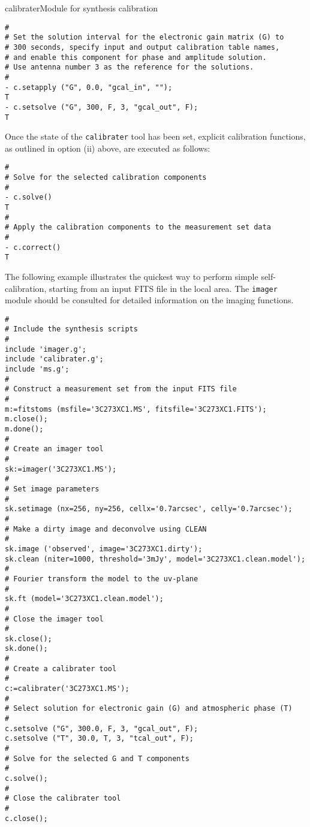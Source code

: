 \begin{ahmodule}{calibrater}{Module for synthesis calibration}
\begin{ahdescription}
\begin{verbatim}
#
# Set the solution interval for the electronic gain matrix (G) to
# 300 seconds, specify input and output calibration table names,
# and enable this component for phase and amplitude solution.
# Use antenna number 3 as the reference for the solutions.
#
- c.setapply ("G", 0.0, "gcal_in", "");
T
- c.setsolve ("G", 300, F, 3, "gcal_out", F);
T
\end{verbatim}

Once the state of the {\tt calibrater} tool has been set, explicit
calibration functions, as outlined in option (ii) above, are executed as
follows:

\begin{verbatim}
#
# Solve for the selected calibration components
#
- c.solve()
T
#
# Apply the calibration components to the measurement set data
#
- c.correct()
T
\end{verbatim}
\end{ahdescription}

\begin{ahexample}

The following example illustrates the quickest way to perform simple
self-calibration, starting from an input FITS file in the local
area. The {\tt imager} module should be consulted for detailed
information on the imaging functions.

\begin{verbatim}
#
# Include the synthesis scripts
#
include 'imager.g';
include 'calibrater.g';
include 'ms.g';
#
# Construct a measurement set from the input FITS file
#
m:=fitstoms (msfile='3C273XC1.MS', fitsfile='3C273XC1.FITS');
m.close(); 
m.done();
#
# Create an imager tool
#
sk:=imager('3C273XC1.MS');
#
# Set image parameters
#
sk.setimage (nx=256, ny=256, cellx='0.7arcsec', celly='0.7arcsec');
#
# Make a dirty image and deconvolve using CLEAN
#
sk.image ('observed', image='3C273XC1.dirty');
sk.clean (niter=1000, threshold='3mJy', model='3C273XC1.clean.model');
#
# Fourier transform the model to the uv-plane
#
sk.ft (model='3C273XC1.clean.model');
#
# Close the imager tool
#
sk.close();
sk.done();
#
# Create a calibrater tool
#
c:=calibrater('3C273XC1.MS');
#
# Select solution for electronic gain (G) and atmospheric phase (T)
#
c.setsolve ("G", 300.0, F, 3, "gcal_out", F);
c.setsolve ("T", 30.0, T, 3, "tcal_out", F);
#
# Solve for the selected G and T components
#
c.solve();
#
# Close the calibrater tool
#
c.close();
\end{verbatim}
\end{ahexample}



                                                                                              
\end{ahmodule}
